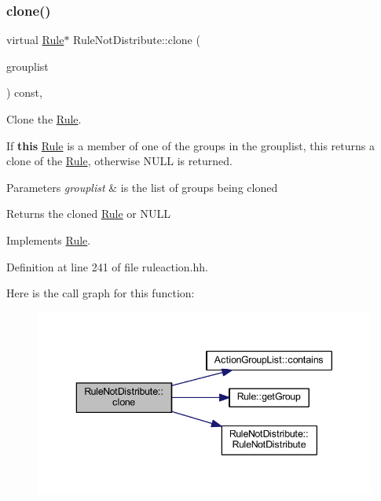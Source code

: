 \subsubsection{\texorpdfstring{clone()}{clone()}}
{\footnotesize\ttfamily virtual \mbox{\hyperlink{class_rule}{Rule}}$\ast$ Rule\+Not\+Distribute\+::clone (\begin{DoxyParamCaption}\item[{const \mbox{\hyperlink{class_action_group_list}{Action\+Group\+List}} \&}]{grouplist }\end{DoxyParamCaption}) const\hspace{0.3cm}{\ttfamily [inline]}, {\ttfamily [virtual]}}



Clone the \mbox{\hyperlink{class_rule}{Rule}}. 

If {\bfseries{this}} \mbox{\hyperlink{class_rule}{Rule}} is a member of one of the groups in the grouplist, this returns a clone of the \mbox{\hyperlink{class_rule}{Rule}}, otherwise N\+U\+LL is returned. 
\begin{DoxyParams}{Parameters}
{\em grouplist} & is the list of groups being cloned \\
\hline
\end{DoxyParams}
\begin{DoxyReturn}{Returns}
the cloned \mbox{\hyperlink{class_rule}{Rule}} or N\+U\+LL 
\end{DoxyReturn}


Implements \mbox{\hyperlink{class_rule_a70de90a76461bfa7ea0b575ce3c11e4d}{Rule}}.



Definition at line 241 of file ruleaction.\+hh.

Here is the call graph for this function\+:
\nopagebreak
\begin{figure}[H]
\begin{center}
\leavevmode
\includegraphics[width=343pt]{class_rule_not_distribute_a15ef3668c177ca8008f4ca27b627c9c3_cgraph}
\end{center}
\end{figure}
\mbox{\label{class_rule_not_distribute_acca6a5aa2370ed69db49818ad3d61f1b}} 
